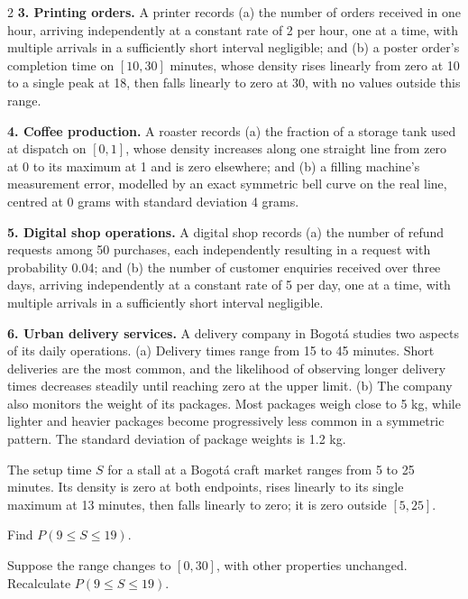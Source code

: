 \begin{multicols}{2}
\textbf{3. Printing orders.} A printer records (a) the number of orders received in one hour, arriving independently at a constant rate of 2 per hour, one at a time, with multiple arrivals in a sufficiently short interval negligible; and (b) a poster order's completion time on $[10,30]$ minutes, whose density rises linearly from zero at 10 to a single peak at 18, then falls linearly to zero at 30, with no values outside this range. 

\textbf{4. Coffee production.} A roaster records (a) the fraction of a storage tank used at dispatch on $[0,1]$, whose density increases along one straight line from zero at 0 to its maximum at 1 and is zero elsewhere; and (b) a filling machine's measurement error, modelled by an exact symmetric bell curve on the real line, centred at 0 grams with standard deviation 4 grams. 

\textbf{5. Digital shop operations.} A digital shop records (a) the number of refund requests among 50 purchases, each independently resulting in a request with probability 0.04; and (b) the number of customer enquiries received over three days, arriving independently at a constant rate of 5 per day, one at a time, with multiple arrivals in a sufficiently short interval negligible. 

\textbf{6. Urban delivery services.} A delivery company in Bogotá studies two aspects of its daily operations. (a) Delivery times range from 15 to 45 minutes. Short deliveries are the most common, and the likelihood of observing longer delivery times decreases steadily until reaching zero at the upper limit. (b) The company also monitors the weight of its packages. Most packages weigh close to 5 kg, while lighter and heavier packages become progressively less common in a symmetric pattern. The standard deviation of package weights is 1.2 kg. 

\begin{minipage}{\linewidth}
	The setup time $S$ for a stall at a Bogotá craft market ranges from 5 to 25 minutes. Its density is zero at both endpoints, rises linearly to its single maximum at 13 minutes, then falls linearly to zero; it is zero outside $[5,25]$.

	Find $P(9\le S\le19)$. 

	Suppose the range changes to $[0,30]$, with  other properties unchanged. Recalculate $P(9\le S\le19)$. 

\end{minipage}\par


\end{multicols}
